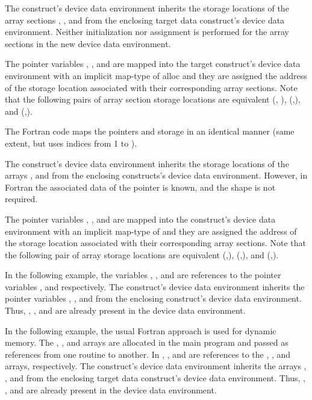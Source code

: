 The  construct's device data environment inherits the storage locations 
of the array sections , , and  from the enclosing target data 
construct's device data environment. Neither initialization nor assignment is performed 
for the array sections in the new device data environment.

The pointer variables , , and  are mapped into the target construct's device 
data environment with an implicit map-type of alloc and they are assigned the address 
of the storage location associated with their corresponding array sections. Note 
that the following pairs of array section storage locations are equivalent (, 
), (,), and (,).


The Fortran code maps the pointers and storage in an identical manner (same extent, 
but uses indices from 1 to ).

The  construct's device data environment inherits the storage locations 
of the arrays ,  and  from the enclosing   constructs's 
device data environment. However, in Fortran the associated data of the pointer 
is known, and the shape is not required.

The pointer variables , , and  are mapped into the  construct's 
device data environment with an implicit map-type of  and they are 
assigned the address of the storage location associated with their corresponding 
array sections. Note that the following pair of array storage locations are equivalent 
(,), (,), and (,).



In the following example, the variables , , and  are references to the pointer 
variables ,  and  respectively. The  construct's device data 
environment inherits the pointer variables , , and  from the enclosing  
 construct's device data environment. Thus, , , and  are already 
present in the device data environment.


In the following example, the usual Fortran approach is used for dynamic memory. 
The , , and  arrays are allocated in the main program and passed as references 
from one routine to another. In , ,  and  are references to the 
, , and  arrays, respectively. The  construct's device data 
environment inherits the arrays , , and  from the enclosing target data construct's 
device data environment. Thus, , , and  are already present in the device 
data environment.


